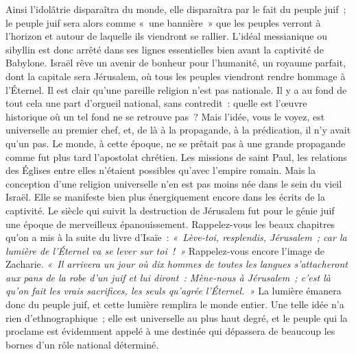 \documentclass[french,twoside]{book} %
\newcommand\orgName[1]{#1}
\newcommand\persName[1]{#1}
\newcommand\placeName[1]{#1}
\begin{document}
Ainsi l’idolâtrie disparaîtra du monde, elle disparaîtra par le fait du {\orgName peuple juif} ; le {\orgName peuple juif} sera alors comme « une bannière » que les peuples verront à l’horizon et autour de laquelle ils viendront se rallier. L’idéal messianique ou sibyllin est donc arrêté dans ses lignes essentielles bien avant la captivité de {\placeName Babylone}. {\orgName Israël} rêve un avenir de bonheur pour l’humanité, un royaume parfait, dont la capitale sera {\placeName Jérusalem}, où tous les peuples viendront rendre hommage à l’{\persName Éternel}. Il est clair qu’une pareille religion n’est pas nationale. Il y a au fond de tout cela une part d’orgueil national, sans contredit : quelle est l’œuvre historique où un tel fond ne se retrouve pas ? Mais l’idée, vous le voyez, est universelle au premier chef, et, de là à la propagande, à la prédication, il n’y avait qu’un pas. Le monde, à cette époque, ne se prêtait pas à une grande propagande comme fut plus tard l’apostolat chrétien. Les missions de {\persName saint Paul}, les relations des Églises entre elles n’étaient possibles qu’avec l’{\orgName empire romain}. Mais la conception d’une religion universelle n’en est pas moins née dans le sein du vieil {\orgName Israël}. Elle se manifeste bien plus énergiquement encore dans les écrits de la captivité. Le siècle qui suivit la destruction de {\placeName Jérusalem} fut pour le génie juif une époque de merveilleux épanouissement. Rappelez-vous les beaux chapitres qu’on a mis à la suite du livre d’{\persName Isaïe} : \emph{« Lève-toi, resplendis, {\orgName Jérusalem} ; car la lumière de l’{\persName Éternel} va se lever sur toi ! »} Rappelez-vous encore l’image de {\persName Zacharie}. \emph{« Il arrivera un jour où dix hommes de toutes les langues s’attacheront aux pans de la robe d’un juif et lui diront : Mène-nous à {\placeName Jérusalem} ; c’est là qu’on fait les vrais sacrifices, les seuls qu’agrée l’{\persName Éternel}. »} La lumière émanera donc du peuple juif, et cette lumière remplira le monde entier. Une telle idée n’a rien d’ethnographique ; elle est universelle au plus haut degré, et le peuple qui la proclame est évidemment appelé à une destinée qui dépassera de beaucoup les bornes d’un rôle national déterminé.\par
\end{document}
